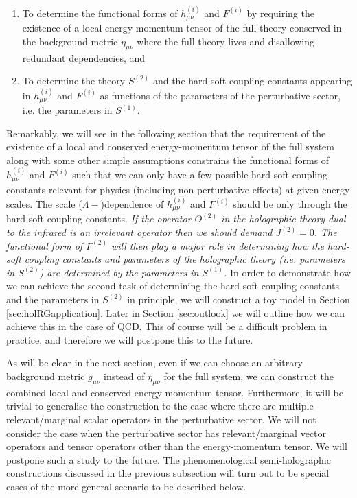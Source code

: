 \documentclass[prd,reprint,a4paper,showpacs,superscriptaddress,11pt,onecolumn,nofootinbib]{revtex4-1}
\renewcommand{\(}{\left(}
\renewcommand{\)}{\right)}
\newcommand{\6}{\partial}
\begin{document}
\begin{enumerate}
\item To determine the functional forms of $h^{(i)}_{\mu\nu}$ and $F^{(i)}$ by requiring the existence of a local energy-momentum tensor of the full theory conserved in the background metric $\eta_{\mu\nu}$ where the full theory lives and disallowing redundant dependencies, and
\item To determine the theory $S^{(2)}$ and the hard-soft coupling constants appearing in $h^{(i)}_{\mu\nu}$ and $F^{(i)}$ as functions of the parameters of the perturbative sector, i.e. the parameters in $S^{(1)}$.
\end{enumerate}
Remarkably, we will see in the following section that the requirement of the existence of a local and conserved energy-momentum tensor of the full system along with some other simple assumptions constrains the functional forms of $h^{(i)}_{\mu\nu}$ and $F^{(i)}$ such that we can only have a few possible hard-soft coupling constants relevant for physics (including non-perturbative effects) at given energy scales. The scale ($\Lambda-$)dependence of $h^{(i)}_{\mu\nu}$ and $F^{(i)}$ should be only through the hard-soft coupling constants. \textit{If the operator $O^{(2)}$ in the holographic theory dual to the infrared is an irrelevant operator then we should demand $J^{(2)} = 0$. The functional form of $F^{(2)}$ will then play a major role in determining how the hard-soft coupling constants and parameters of the holographic theory (i.e. parameters in $S^{(2)}$) are determined by the parameters in $S^{(1)}$.} In order to demonstrate how we can achieve the second task of determining the hard-soft coupling constants and the parameters in $S^{(2)}$ in principle, we will construct a toy model in Section \ref{sec:holRGapplication}. Later in Section \ref{sec:outlook} we will outline how we can achieve this in the case of QCD. This of course will be a difficult problem in practice, and therefore we will postpone this to the future.

As will be clear in the next section, even if we can choose an arbitrary background metric $g_{\mu\nu}$ instead of $\eta_{\mu\nu}$ for the full system, we can construct the combined local and conserved energy-momentum tensor. Furthermore, it will be trivial to generalise the construction to the case where there are multiple relevant/marginal scalar operators in the perturbative sector. We will not consider the case when the perturbative sector has relevant/marginal vector operators and tensor operators other than the energy-momentum tensor. We will postpone such a study to the future. The phenomenological semi-holographic constructions discussed in the previous subsection will turn out to be special cases of the more general scenario to be described below.
 
\end{document}
